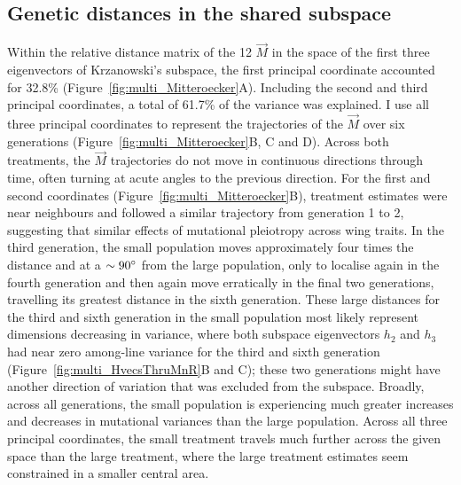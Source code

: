 \subsection{Genetic distances in the shared subspace}

Within the relative distance matrix of the 12 $\vec{M}$ in the space of the first three eigenvectors of Krzanowski’s subspace, the first principal coordinate accounted for 32.8\% (Figure~\ref{fig:multi_Mitteroecker}A). Including the second and third principal coordinates, a total of 61.7\% of the variance was explained. I use all three principal coordinates to represent the trajectories of the $\vec{M}$ over six generations (Figure~\ref{fig:multi_Mitteroecker}B, C and D). Across both treatments, the $\vec{M}$ trajectories do not move in continuous directions through time, often turning at acute angles to the previous direction. For the first and second coordinates (Figure~\ref{fig:multi_Mitteroecker}B), treatment estimates were near neighbours and followed a similar trajectory from generation 1 to 2, suggesting that similar effects of mutational pleiotropy across wing traits. In the third generation, the small population moves approximately four times the distance and at a $\sim90\degree$ from the large population, only to localise again in the fourth generation and then again move erratically in the final two generations, travelling its greatest distance in the sixth generation. These large distances for the third and sixth generation in the small population most likely represent dimensions decreasing in variance, where both subspace eigenvectors $h_2$ and $h_3$ had near zero among-line variance for the third and sixth generation (Figure~\ref{fig:multi_HvecsThruMnR}B and C); these two generations might have another direction of variation that was excluded from the subspace. Broadly, across all generations, the small population is experiencing much greater increases and decreases in mutational variances than the large population. Across all three principal coordinates, the small treatment travels much further across the given space than the large treatment, where the large treatment estimates seem constrained in a smaller central area.\par

